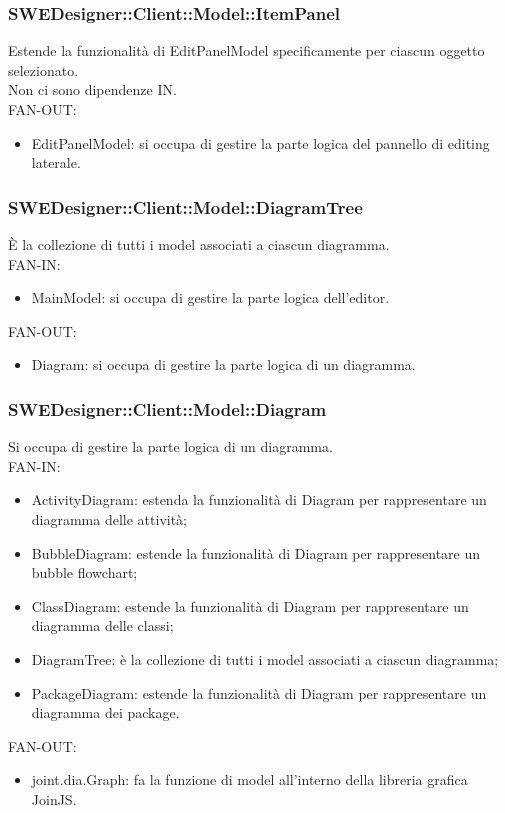 \documentclass[../PianoDiQualifica.tex]{subfiles}
\begin{document}
		\subsubsection{SWEDesigner::Client::Model::ItemPanel}
		Estende la funzionalità di EditPanelModel specificamente per ciascun oggetto selezionato.\\
		Non ci sono dipendenze IN.\\
		FAN-OUT:
		\begin{itemize}
			\item EditPanelModel: si occupa di gestire la parte logica del pannello di editing laterale.
		\end{itemize}
		\subsubsection{SWEDesigner::Client::Model::DiagramTree}
		È la collezione di tutti i model associati a ciascun diagramma.\\
		FAN-IN:
		\begin{itemize}
			\item MainModel: si occupa di gestire la parte logica dell'editor.
		\end{itemize}
		FAN-OUT:
		\begin{itemize}
			\item Diagram: si occupa di gestire la parte logica di un diagramma.
		\end{itemize}
		\subsubsection{SWEDesigner::Client::Model::Diagram}
		Si occupa di gestire la parte logica di un diagramma.\\
		FAN-IN:
		\begin{itemize}
			\item ActivityDiagram: estenda la funzionalità di Diagram per rappresentare un diagramma delle attività;
			\item BubbleDiagram: estende la funzionalità di Diagram per rappresentare un bubble flowchart;
			\item ClassDiagram: estende la funzionalità di Diagram per rappresentare un diagramma delle classi;
			\item DiagramTree: è la collezione di tutti i model associati a ciascun diagramma;
			\item PackageDiagram: estende la funzionalità di Diagram per rappresentare un diagramma dei package.
		\end{itemize}
		FAN-OUT:
		\begin{itemize}
			\item joint.dia.Graph: fa la funzione di model all'interno della libreria grafica JoinJS.
		\end{itemize}
\end{document}
